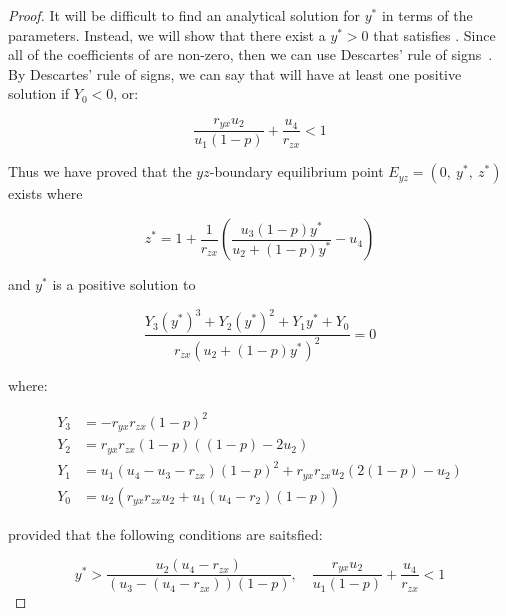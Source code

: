 \begin{proof}
    It will be difficult to find an analytical solution for $y^*$ in terms of the parameters. Instead, we will show that there exist a $y^*>0$ that satisfies . Since all of the coefficients of  are non-zero, then we can use Descartes' rule of signs~\cite{WANG2004525526}. By Descartes' rule of signs, we can say that  will have at least one positive solution if $Y_0<0$, or:
    
    \begin{equation*}
        \frac{r_{yx}u_2}{u_1\left(1-p\right)}+\frac{u_4}{r_{zx}} < 1
    \end{equation*}

    Thus we have proved that the $yz$-boundary equilibrium point $E_{yz}=\left(0,\ y^*,\ z^*\right)$ exists where
    
    \begin{equation*}
        z^*=1+\frac{1}{r_{zx}}\left(\frac{u_3\left(1-p\right)y^*}{u_2+\left(1-p\right)y^*}-u_4\right)
    \end{equation*}

    and $y^*$ is a positive solution to 

    \begin{equation*}
        \frac{Y_3\left(y^*\right)^3+Y_2\left(y^*\right)^2+Y_1y^*+Y_0}{r_{zx}\left(u_2+\left(1-p\right)y^*\right)^2}=0
    \end{equation*}

    where:

    \begin{align*}
        Y_3 &= -r_{yx}r_{zx}\left(1-p\right)^2\\
        Y_2 &= r_{yx}r_{zx}\left(1-p\right)\left(\left(1-p\right)-2u_2\right)\\
        Y_1 &= u_1\left(u_4-u_3-r_{zx}\right)\left(1-p\right)^2+r_{yx}r_{zx}u_2\left(2\left(1-p\right)-u_2\right)\\
        Y_0 &= u_2\left(r_{yx}r_{zx}u_2+u_1\left(u_4-r_2\right)\left(1-p\right)\right)
    \end{align*}

    provided that the following conditions are saitsfied:
    
    \begin{equation*}
        y^*>\frac{u_2\left(u_4-r_{zx}\right)}{\left(u_3-\left(u_4-r_{zx}\right)\right)\left(1-p\right)},\quad \frac{r_{yx}u_2}{u_1\left(1-p\right)}+\frac{u_4}{r_{zx}}<1
    \end{equation*}
\end{proof}

